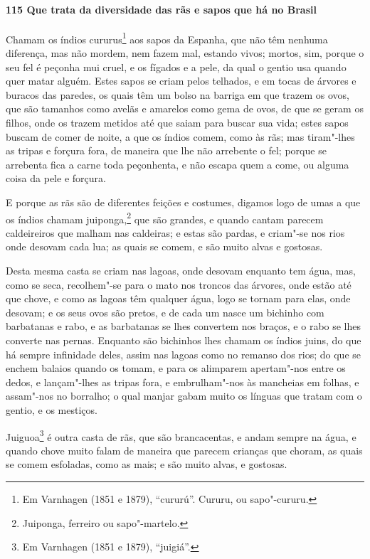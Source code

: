 \paragraph{115 Que trata da diversidade das rãs e sapos que há no Brasil}

Chamam os índios cururus\footnote{ Em Varnhagen (1851 e 1879), ``cururú''. Cururu, ou
sapo"-cururu.} aos sapos da Espanha, que não têm nenhuma diferença, mas não mordem, nem
fazem mal, estando vivos; mortos, sim, porque o seu fel é peçonha mui cruel, e os fígados
e a pele, da qual o gentio usa quando quer matar alguém. Estes sapos se criam pelos
telhados, e em tocas de árvores e buracos das paredes, os quais têm um bolso na barriga em
que trazem os ovos, que são tamanhos como avelãs e amarelos como gema de ovos, de que se
geram os filhos, onde os trazem metidos até que saiam para buscar sua vida; estes sapos
buscam de comer de noite, a que os índios comem, como às rãs; mas tiram"-lhes as tripas e
forçura fora, de maneira que lhe não arrebente o fel; porque se arrebenta fica a carne
toda peçonhenta, e não escapa quem a come, ou alguma coisa da pele e forçura.

E porque as rãs são de diferentes feições e costumes, digamos logo de umas a que os índios
chamam juiponga,\footnote{ Juiponga, ferreiro ou sapo"-martelo.} que são grandes, e quando
cantam parecem caldeireiros que malham nas caldeiras; e estas são pardas, e criam"-se nos
rios onde desovam cada lua; as quais se comem, e são muito alvas e gostosas.

Desta mesma casta se criam nas lagoas, onde desovam enquanto tem água, mas, como se seca,
recolhem"-se para o mato nos troncos das árvores, onde estão até que chove, e como as
lagoas têm qualquer água, logo se tornam para elas, onde desovam; e os seus ovos são
pretos, e de cada um nasce um bichinho com barbatanas e rabo, e as barbatanas se lhes
convertem nos braços, e o rabo se lhes converte nas pernas. Enquanto são bichinhos lhes
chamam os índios juins, do que há sempre infinidade deles, assim nas lagoas como no
remanso dos rios; do que se enchem balaios quando os tomam, e para os alimparem
apertam"-nos entre os dedos, e lançam"-lhes as tripas fora, e embrulham"-nos às mancheias em
folhas, e assam"-nos no borralho; o qual manjar gabam muito os línguas que tratam com o
gentio, e os mestiços.

Juiguoa\footnote{ Em Varnhagen (1851 e 1879), ``juigiá''.} é outra casta de rãs, que são
brancacentas, e andam sempre na água, e quando chove muito falam de maneira que parecem
crianças que choram, as quais se comem esfoladas, como as mais; e são muito alvas, e
gostosas.

